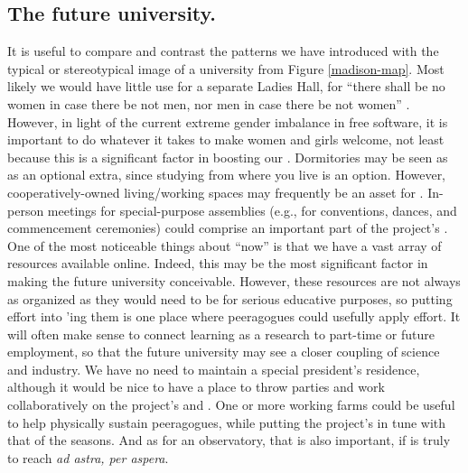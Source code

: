 \subsection{The future university.}
It is useful to compare and contrast the patterns we have introduced
with the typical or stereotypical image of a university from Figure
\ref{madison-map}.  Most likely we would have little use for a
separate Ladies Hall, for ``there shall be no women in case there be
not men, nor men in case there be not women'' \cite[Chapter
  1.LII]{rabelais1894gargantua}.  However, in light of the current
extreme gender imbalance in free software, it is important to do
whatever it takes to make women and girls welcome, not least because
this is a significant factor in boosting our .  Dormitories may be seen as as an optional extra, since
studying from where you live is an option.  However,
cooperatively-owned living/working spaces may frequently be an asset
for .  In-person meetings for
special-purpose assemblies (e.g., for conventions, dances, and
commencement ceremonies) could comprise an important part of the
project's .  One of the most noticeable things
about ``now'' is that we have a vast array of resources available
online.  Indeed, this may be the most significant factor in making the
future university conceivable.  However, these resources are not
always as organized as they would need to be for serious educative
purposes, so putting effort into 'ing them is one place where peeragogues could usefully
apply effort.  It will often make sense to connect learning as a
research  to part-time or future employment, so
that the future university may see a closer coupling of science and
industry.  We have no need to maintain a special president's
residence, although it would be nice to have a place to throw parties
and work collaboratively on the project's  and
.  One or more working farms could be useful to
help physically sustain peeragogues, while putting the project's
 in tune with that of the seasons.  And as for
an observatory, that is also important, if  is
truly to reach \emph{ad astra, per aspera}.


  